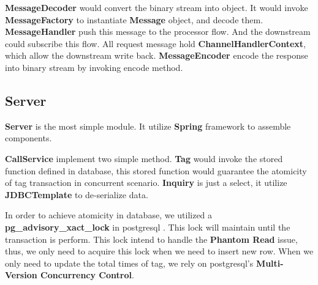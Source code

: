 \documentclass{article}
\begin{document}
    \textbf{MessageDecoder} would convert the binary stream into object.
    It would invoke \textbf{MessageFactory} to instantiate \textbf{Message} object, and decode them. \textbf{MessageHandler} push this message to the processor flow.
    And the downstream could subscribe this flow.
    All request message hold \textbf{ChannelHandlerContext}, which allow the downstream write back. \textbf{MessageEncoder} encode the response into binary stream by invoking encode method.

    \subsection{Server}
    \textbf{Server} is the most simple module.
    It utilize \textbf{Spring} \cite{spring} framework to assemble components.

    \textbf{CallService} implement two simple method. \textbf{Tag} would invoke the stored function defined in database, this stored function would guarantee the atomicity of tag transaction in concurrent scenario. \textbf{Inquiry} is just a select, it utilize \textbf{JDBCTemplate} to de-serialize data.

    In order to achieve atomicity in database, we utilized a \textbf{pg\_advisory\_xact\_lock} in postgresql \cite{pg}.
    This lock will maintain until the transaction is perform.
    This lock intend to handle the \textbf{Phantom Read} issue, thus, we only need to acquire this lock when we need to insert new row.
    When we only need to update the total times of tag, we rely on postgresql's \textbf{Multi-Version Concurrency Control}.

    {}
    
\end{document}
